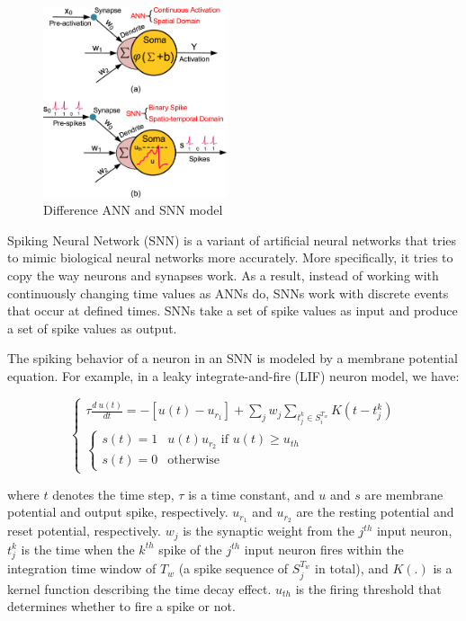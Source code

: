 \documentclass[11pt]{article}
\begin{document}
\begin{figure}
  \centering
  \includegraphics[width=0.48\textwidth,height=0.213\textheight,keepaspectratio]{./image/sums_up.jpg}
  \caption{Difference ANN and SNN model\cite{rething_comparison_ann_snn}}
\end{figure}


Spiking Neural Network (SNN) is a variant of artificial neural networks that tries to mimic biological neural networks more accurately. More specifically, it tries to copy the way neurons and synapses work. As a result, instead of working with continuously changing time values as ANNs do, SNNs work with discrete events that occur at defined times. SNNs take a set of spike values as input and produce a set of spike values as output.

The spiking behavior of a neuron in an SNN is modeled by a membrane potential equation. For example, in a leaky integrate-and-fire (LIF) neuron model, we have:

\begin{equation}
  \begin{cases}
    \tau \frac{d \: u(t)}{dt} = - [u(t) - u_{r_1}] + \sum_j w_j \sum_{t_j^k \in  S_i^{T_w}} K(t - t_j^k) \\
    \begin{cases}
      s(t) = 1 & u(t) u_{r_2} \text{ if } u(t) \geq u_{th} \\
      s(t) = 0 & \text{otherwise}
    \end{cases}
  \end{cases}
\end{equation}

where $t$ denotes the time step, $\tau$ is a time constant, and $u$ and $s$ are membrane potential and output spike, respectively.
$u_{r_1}$ and $u_{r_2}$ are the resting potential and reset potential, respectively. $w_j$ is the synaptic weight from the $j^{th}$ input neuron, $t_j^k$ is the time when the $k^{th}$ spike of the $j^{th}$ input neuron fires within the integration time window of $T_w$ (a spike sequence of $S_j^{T_w}$ in total), and $K(.)$ is a kernel function describing the time decay effect. $u_{th}$ is the firing threshold that determines whether to fire a spike or not. \cite{rething_comparison_ann_snn}
\end{document}
